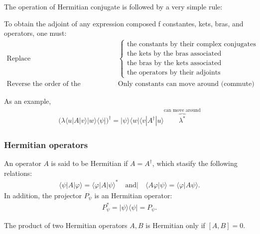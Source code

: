 The operation of Hermitian conjugate is followed by a very simple rule:
\begin{definition}
    To obtain the adjoint of any expression composed f constantes, kets, bras, and operators, one must:
    \begin{align*}
        \text{Replace}&\qquad\left\{
            \begin{array}{l}
                \text{the constants by their complex conjugates}\\
                \text{the kets by the bras associated}\\
                \text{the bras by the kets associated}\\
                \text{the operators by their adjoints}
            \end{array}
        \right.\\
        \text{Reverse the order of the factors}&\qquad\text{Only constants can move around (commute)}
    \end{align*}

    As an example,
    \begin{align*}
        \bigr(\lambda\langle u|A|v\rangle|w\rangle\langle\psi|\bigr)^\dagger=|\psi\rangle\langle w|\langle v|A^\dagger|u\rangle\overbrace{\lambda^*}^{\text{can move around}}
    \end{align*}
\end{definition}

\subsubsection{Hermitian operators}
An operator $A$ is said to be Hermitian if $A=A^\dagger$, which stasify the following relations:
\begin{align*}
    \langle\psi|A|\varphi\rangle=\langle\varphi|A|\psi\rangle^*\quad\text{and}|\quad\langle A\varphi|\psi\rangle=\langle\varphi|A\psi\rangle.
\end{align*}
In addition, the projector $P_\psi$ is an Hermitian operator:
\begin{align}
    P_\psi^*=|\psi\rangle\langle\psi|=P_\psi.
\end{align}

\begin{emphasizer}
    The product of two Hermitian operators $A,B$ is Hermitian only if $[A,B]=0$.
\end{emphasizer}